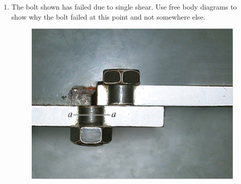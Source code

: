 \documentclass[12pt, oneside]{article}
\begin{document}
\begin{enumerate}
	\item %
		The bolt shown has failed due to single shear.
		Use free body diagrams to show why the bolt failed at this point and not somewhere else.
		\begin{figure}[H]
			\centering
			\includegraphics[width=0.6\linewidth]{bolt}
			\label{fig:bolt}
		\end{figure}

\end{enumerate}
\end{document}

